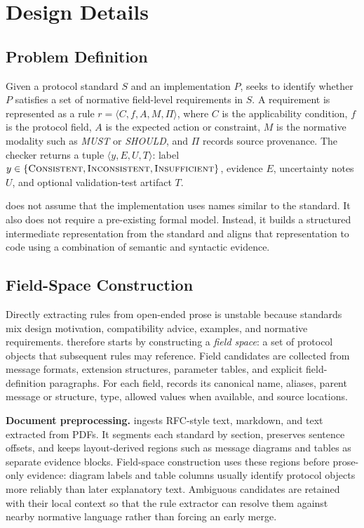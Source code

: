 \section{Design Details}
\label{sec:method}

\subsection{Problem Definition}

Given a protocol standard $S$ and an implementation $P$, \tool{} seeks to
identify whether $P$ satisfies a set of normative field-level requirements in
$S$. A requirement is represented as a rule
$r=\langle C, f, A, M, \Pi\rangle$, where $C$ is the applicability condition,
$f$ is the protocol field, $A$ is the expected action or constraint, $M$ is the
normative modality such as \emph{MUST} or \emph{SHOULD}, and $\Pi$ records
source provenance. The checker returns a tuple
$\langle y,E,U,T\rangle$: label $y\in\{\textsc{Consistent},
\textsc{Inconsistent},\textsc{Insufficient}\}$, evidence $E$, uncertainty notes
$U$, and optional validation-test artifact $T$.

\tool{} does not assume that the implementation uses names similar to the
standard. It also does not require a pre-existing formal model. Instead, it
builds a structured intermediate representation from the standard and aligns
that representation to code using a combination of semantic and syntactic
evidence.

\subsection{Field-Space Construction}
\label{sec:fieldspace}

Directly extracting rules from open-ended prose is unstable because standards
mix design motivation, compatibility advice, examples, and normative
requirements. \tool{} therefore starts by constructing a \emph{field space}: a
set of protocol objects that subsequent rules may reference. Field candidates
are collected from message formats, extension structures, parameter tables, and
explicit field-definition paragraphs. For each field, \tool{} records its
canonical name, aliases, parent message or structure, type, allowed values when
available, and source locations.

\textbf{Document preprocessing.}
\tool{} ingests RFC-style text, markdown, and text extracted from PDFs. It
segments each standard by section, preserves sentence offsets, and keeps
layout-derived regions such as message diagrams and tables as separate evidence
blocks. Field-space construction uses these regions before prose-only evidence:
diagram labels and table columns usually identify protocol objects more
reliably than later explanatory text. Ambiguous candidates are retained with
their local context so that the rule extractor can resolve them against nearby
normative language rather than forcing an early merge.

